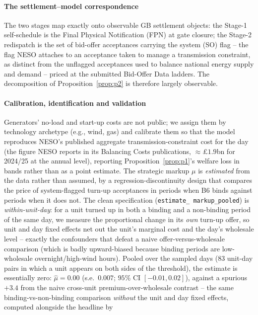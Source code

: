 \documentclass[review,3p,times]{elsarticle}
\theoremstyle{plain}
\theoremstyle{definition}
\begin{document}
\paragraph{The settlement--model correspondence} The two stages map exactly
onto observable GB settlement objects: the Stage-1 self-schedule is the Final
Physical Notification (FPN) at gate closure; the Stage-2 redispatch is the set of
bid-offer acceptances carrying the system (SO) flag -- the flag NESO attaches to
an acceptance taken to manage a transmission constraint, as distinct from the
unflagged acceptances used to balance national energy supply and demand -- priced
at the submitted Bid-Offer
Data ladders. The decomposition of Proposition~\ref{prop:p2} is therefore
largely observable.

\paragraph{Calibration, identification and validation} Generators' no-load and
start-up costs are not public; we assign them by technology archetype (e.g., wind, gas) and
calibrate them so that the model reproduces NESO's published aggregate
transmission-constraint cost for the day (the figure NESO reports in its
Balancing Costs publications, $\approx\pounds1.9$bn for 2024/25 at the annual
level), reporting Proposition~\ref{prop:p1}'s welfare loss in bands
rather than as a point estimate. The strategic markup $\mu$ is \emph{estimated}
from the data rather than assumed, by a regression-discontinuity design that
compares the price of system-flagged turn-up acceptances in periods when B6 binds
against periods when it does not. The clean specification (\texttt{estimate\_%
markup\_pooled}) is \emph{within-unit-day}: for a unit turned up in both a binding
and a non-binding period of the same day, we measure the proportional change in
its \emph{own} turn-up offer, so unit and day fixed effects net out the unit's
marginal cost and the day's wholesale level -- exactly the confounders that defeat
a naive offer-versus-wholesale comparison (which is badly upward-biased because
binding periods are low-wholesale overnight/high-wind hours). Pooled over the
sampled days (83 unit-day pairs in which a unit appears on both sides of the
threshold), the estimate is essentially zero: $\hat\mu=0.00$ (s.e.\ $0.007$;
$95\%$ CI $[-0.01,0.02]$), against a spurious $+3.4$ from the naive cross-unit
premium-over-wholesale contrast -- the same binding-vs-non-binding comparison
\emph{without} the unit and day fixed effects, computed alongside the headline by
\end{document}
